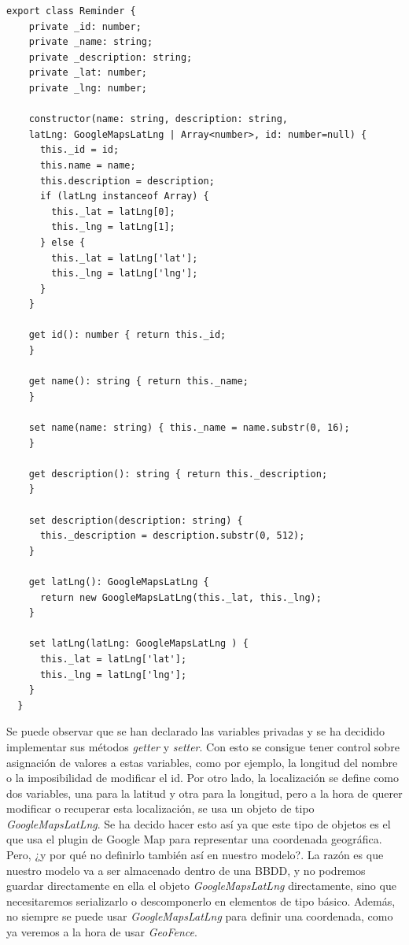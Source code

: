 \begin{lstlisting}[style=htmlcssjs,frame=tlrb,xleftmargin={0.2cm}]
  export class Reminder {
    private _id: number;
    private _name: string;
    private _description: string;
    private _lat: number;
    private _lng: number;

    constructor(name: string, description: string,
    latLng: GoogleMapsLatLng | Array<number>, id: number=null) {
      this._id = id;
      this.name = name;
      this.description = description;
      if (latLng instanceof Array) {
        this._lat = latLng[0];
        this._lng = latLng[1];
      } else {
        this._lat = latLng['lat'];
        this._lng = latLng['lng'];
      }
    }

    get id(): number { return this._id;
    }

    get name(): string { return this._name;
    }

    set name(name: string) { this._name = name.substr(0, 16);
    }

    get description(): string { return this._description;
    }

    set description(description: string) {
      this._description = description.substr(0, 512);
    }

    get latLng(): GoogleMapsLatLng {
      return new GoogleMapsLatLng(this._lat, this._lng);
    }

    set latLng(latLng: GoogleMapsLatLng ) {
      this._lat = latLng['lat'];
      this._lng = latLng['lng'];
    }
  }
\end{lstlisting}

Se puede observar que se han declarado las variables privadas y se ha decidido implementar sus métodos \emph{getter} y \emph{setter}. Con esto se consigue tener control sobre asignación de valores a estas variables, como por ejemplo, la longitud del nombre o la imposibilidad de modificar el id. Por otro lado, la localización se define como dos variables, una para la latitud y otra para la longitud, pero a la hora de querer modificar o recuperar esta localización, se usa un objeto de tipo \emph{GoogleMapsLatLng}. Se ha decido hacer esto así ya que este tipo de objetos es el que usa el plugin de Google Map para representar una coordenada geográfica. Pero, ¿y por qué no definirlo también así en nuestro modelo?. La razón es que nuestro modelo va a ser almacenado dentro de una \gls{BBDD}, y no podremos guardar directamente en ella el objeto \emph{GoogleMapsLatLng} directamente, sino que necesitaremos serializarlo o descomponerlo en elementos de tipo básico. Además, no siempre se puede usar \emph{GoogleMapsLatLng} para definir una coordenada, como ya veremos a la hora de usar \emph{GeoFence}.

